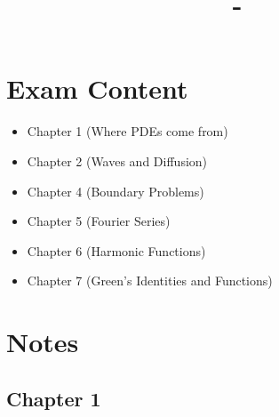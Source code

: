 \documentclass[answers,12pt,addpoints]{exam}
\author{\name}
\title{\course \ - \assignment}
\begin{document}
\maketitle
\tableofcontents
\newpage
\section*{Exam Content}
\begin{itemize}
    \item Chapter 1 (Where PDEs come from)
    \item Chapter 2 (Waves and Diffusion)
    \item Chapter 4 (Boundary Problems)
    \item Chapter 5 (Fourier Series)
    \item Chapter 6 (Harmonic Functions)
    \item Chapter 7 (Green's Identities and Functions)
\end{itemize}

\section*{Notes}
\subsection{Chapter 1}
\end{document}
